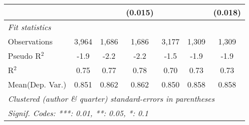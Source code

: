 \begin{tabular}{lcccccc}
                           &         &             & (0.015)      &         &             & (0.018)\\   
   \midrule
   \emph{Fit statistics}\\
   Observations            & 3,964   & 1,686       & 1,686        & 3,177   & 1,309       & 1,309\\  
   Pseudo R$^2$            & -1.9    & -2.2        & -2.2         & -1.5    & -1.9        & -1.9\\  
   R$^2$                   & 0.75    & 0.77        & 0.78         & 0.70    & 0.73        & 0.73\\  
Mean(Dep. Var.) & 0.851 & 0.862 & 0.862 & 0.850 & 0.858 & 0.858 \\
   \midrule \midrule
   \multicolumn{7}{l}{\emph{Clustered (author \& quarter) standard-errors in parentheses}}\\
   \multicolumn{7}{l}{\emph{Signif. Codes: ***: 0.01, **: 0.05, *: 0.1}}\\
\end{tabular}
\par\endgroup
